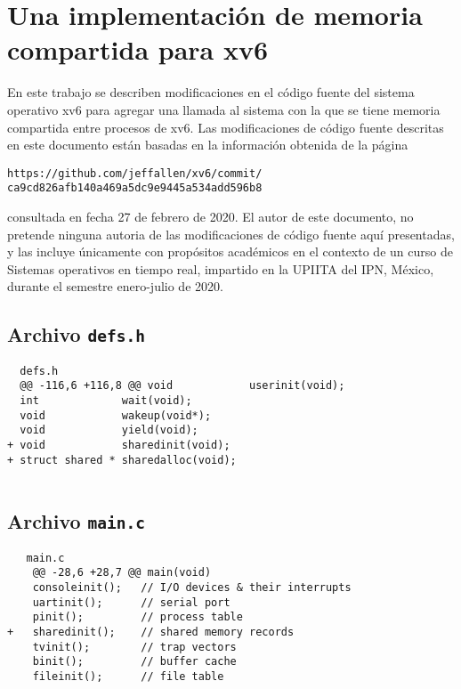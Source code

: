 \documentclass[12pt]{article}
\begin{document}
\section{Una implementaci\'{o}n de memoria compartida para xv6}
En este trabajo se describen modif\/icaciones en el c\'{o}digo fuente 
del sistema operativo xv6 para agregar una llamada al sistema con la 
que se tiene memoria compartida entre procesos de xv6. Las modif\/icaciones 
de c\'{o}digo fuente descritas en este documento est\'{a}n basadas en la 
informaci\'{o}n obtenida de la p\'{a}gina
\begin{verbatim}
https://github.com/jeffallen/xv6/commit/
ca9cd826afb140a469a5dc9e9445a534add596b8
\end{verbatim}
consultada en fecha 27 de febrero de 2020. El autor de este documento, no 
pretende ninguna autoria de las modificaciones de c\'{o}digo fuente 
aqu\'{i} presentadas, y las incluye \'{u}nicamente con prop\'{o}sitos 
acad\'{e}micos en el contexto de un curso de Sistemas operativos en tiempo 
real, impartido en la UPIITA del IPN, M\'{e}xico, durante el semestre 
enero-julio de 2020.

\subsection{Archivo {\tt defs.h}}
\begin{verbatim}
  defs.h 
  @@ -116,6 +116,8 @@ void            userinit(void);
  int             wait(void);
  void            wakeup(void*);
  void            yield(void);
+ void            sharedinit(void);
+ struct shared * sharedalloc(void);
  
\end{verbatim}

\subsection{Archivo {\tt main.c}}
\begin{verbatim}
   main.c 
    @@ -28,6 +28,7 @@ main(void)
    consoleinit();   // I/O devices & their interrupts
    uartinit();      // serial port
    pinit();         // process table
+   sharedinit();    // shared memory records
    tvinit();        // trap vectors
    binit();         // buffer cache
    fileinit();      // file table
  
\end{verbatim}
\end{document}
